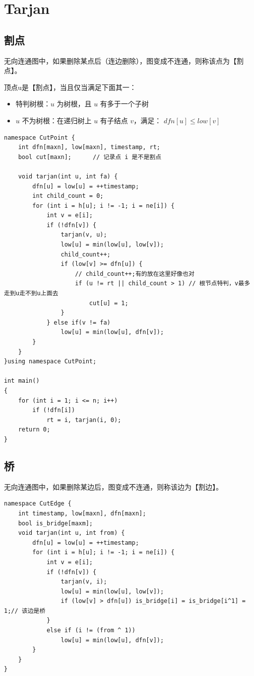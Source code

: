 \section{Tarjan}

\subsection{割点}
\par \noindent 无向连通图中，如果删除某点后（连边删除），图变成不连通，则称该点为【割点】。
\par \noindent 顶点u是【割点】，当且仅当满足下面其一：
\begin{itemize}
\item 特判树根：$u$ 为树根，且 $u$ 有多于一个子树
\item $u$ 不为树根：在递归树上 $u$ 有子结点 $v$，满足： $dfn[u]\leq low[v]$
\end{itemize}

\begin{verbatim}
namespace CutPoint {
    int dfn[maxn], low[maxn], timestamp, rt;
    bool cut[maxn];      // 记录点 i 是不是割点
    
    void tarjan(int u, int fa) {
        dfn[u] = low[u] = ++timestamp;
        int child_count = 0;
        for (int i = h[u]; i != -1; i = ne[i]) {
            int v = e[i];
            if (!dfn[v]) {
                tarjan(v, u);
                low[u] = min(low[u], low[v]);
                child_count++;
                if (low[v] >= dfn[u]) {
                    // child_count++;有的放在这里好像也对
                    if (u != rt || child_count > 1) // 根节点特判，v最多走到u走不到u上面去
                        cut[u] = 1;
                }
            } else if(v != fa)
                low[u] = min(low[u], dfn[v]);
        }
    }
}using namespace CutPoint;

int main()
{
    for (int i = 1; i <= n; i++)
        if (!dfn[i])
            rt = i, tarjan(i, 0);
    return 0;
}
\end{verbatim}

\subsection{桥}
\par \noindent 无向连通图中，如果删除某边后，图变成不连通，则称该边为【割边】。
\begin{verbatim}
namespace CutEdge {
    int timestamp, low[maxn], dfn[maxn];
    bool is_bridge[maxm];
    void tarjan(int u, int from) {
        dfn[u] = low[u] = ++timestamp;
        for (int i = h[u]; i != -1; i = ne[i]) {
            int v = e[i];
            if (!dfn[v]) {
                tarjan(v, i);
                low[u] = min(low[u], low[v]);
                if (low[v] > dfn[u]) is_bridge[i] = is_bridge[i^1] = 1;// 该边是桥
            }
            else if (i != (from ^ 1))
                low[u] = min(low[u], dfn[v]);
        }
    }
}
\end{verbatim}


